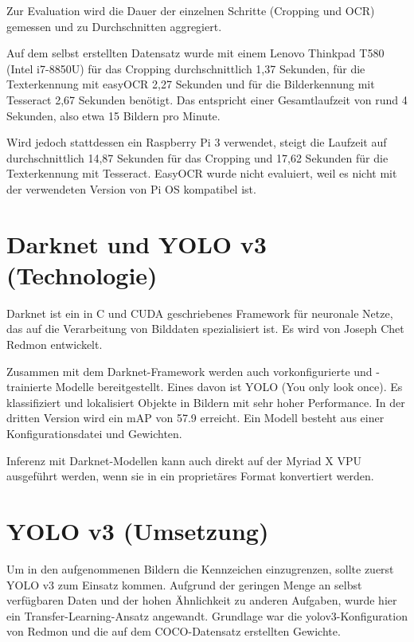 Zur Evaluation wird die Dauer der einzelnen Schritte (Cropping und OCR) gemessen und zu Durchschnitten aggregiert. 

Auf dem selbst erstellten Datensatz wurde mit einem Lenovo Thinkpad T580 (Intel i7-8850U) für das Cropping durchschnittlich 1,37 Sekunden,
für die Texterkennung mit easyOCR 2,27 Sekunden und für die Bilderkennung mit Tesseract 2,67 Sekunden benötigt.
Das entspricht einer Gesamtlaufzeit von rund 4 Sekunden, also etwa 15 Bildern pro Minute.

Wird jedoch stattdessen ein Raspberry Pi 3 verwendet, steigt die Laufzeit auf durchschnittlich 14,87 Sekunden für das Cropping und 17,62 Sekunden für die Texterkennung mit Tesseract.
EasyOCR wurde nicht evaluiert, weil es nicht mit der verwendeten Version von Pi OS kompatibel ist.


\section{Darknet und YOLO v3 (Technologie)}
	
	Darknet ist ein in C und CUDA geschriebenes Framework für neuronale Netze, das auf die Verarbeitung von Bilddaten spezialisiert ist. Es wird von Joseph Chet Redmon entwickelt. \autocite{darknet13}
	
	Zusammen mit dem Darknet-Framework werden auch vorkonfigurierte und -trainierte Modelle bereitgestellt. Eines davon ist YOLO (You only look once). Es klassifiziert und lokalisiert Objekte in Bildern mit sehr hoher Performance. In der dritten Version wird ein mAP von 57.9 erreicht. Ein Modell besteht aus einer Konfigurationsdatei und Gewichten. \autocite{yolov3}
	
	Inferenz mit Darknet-Modellen kann auch direkt auf der Myriad X VPU ausgeführt werden, wenn sie in ein proprietäres Format konvertiert werden.
	
	
\section{YOLO v3 (Umsetzung)}

Um in den aufgenommenen Bildern die Kennzeichen einzugrenzen, sollte zuerst YOLO v3 zum Einsatz kommen. Aufgrund der geringen Menge an selbst verfügbaren Daten und der hohen Ähnlichkeit zu anderen Aufgaben, wurde hier ein Transfer-Learning-Ansatz angewandt. Grundlage war die yolov3-Konfiguration von Redmon und die auf dem COCO-Datensatz erstellten Gewichte.

